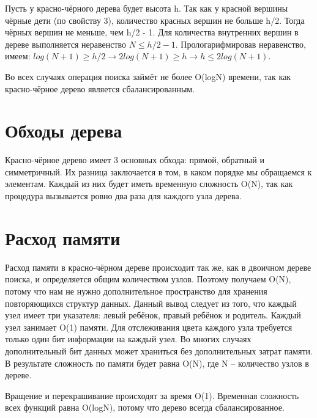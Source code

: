 \documentclass[bachelor, och, referat, times]{SCWorks}
\begin{document}
Пусть у красно-чёрного дерева будет высота h. Так как у красной вершины чёрные дети (по свойству 3),
 количество красных вершин не больше h/2. Тогда чёрных вершин не меньше, чем h/2 - 1. 
 Для количества внутренних вершин в дереве выполняется неравенство $N\leq h/2-1$.
  Прологарифмировав неравенство, имеем: $log(N+1)\geq h/2 \rightarrow  2log(N+1)\geq h \rightarrow  h\leq 2 log (N + 1)$.

Во всех случаях операция поиска займёт не более O(logN) времени, 
так как красно-чёрное дерево является сбалансированным.


  \section{Обходы дерева}

Красно-чёрное дерево имеет 3 основных обхода: прямой, обратный и симметричный. 
Их разница заключается в том, в каком порядке мы обращаемся к элементам. 
Каждый из них будет иметь временную сложность O(N), 
так как процедура вызывается ровно два раза для каждого узла дерева.


  \section{Расход памяти}

Расход памяти в красно-чёрном дереве происходит так же, 
как в двоичном дереве поиска, и определяется общим количеством узлов. 
Поэтому получаем O(N), потому что нам не нужно дополнительное пространство для хранения 
повторяющихся структур данных. Данный вывод следует из того, что каждый узел имеет три указателя: 
левый ребёнок, правый ребёнок и родитель. Каждый узел занимает O(1) памяти. 
Для отслеживания цвета каждого узла требуется только один бит информации на каждый узел. 
Во многих случаях дополнительный бит данных может храниться без дополнительных затрат памяти. 
В результате сложность по памяти будет равна O(N), где N – количество узлов в дереве.


Вращение и перекрашивание происходят за время O(1). 
Временная сложность всех функций равна O(logN), потому что дерево всегда сбалансированное.

    \appendix
     
\end{document}
